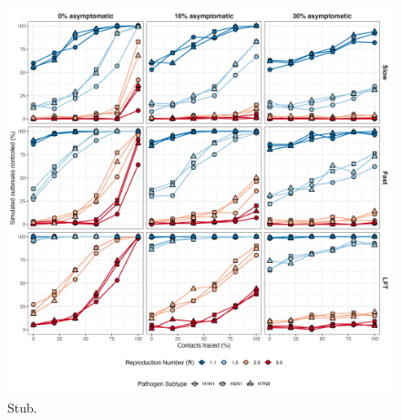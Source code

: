 \documentclass{article}
\begin{document}
\begin{figure}[ht]
\centering
\includegraphics[width=\textwidth]{../plots/prop_outbreak_control_prop_asym_iso.png}
\caption{Stub.}
\label{fig:prop-outbreak-control-prop-asym-iso}
\end{figure}
\end{document}

